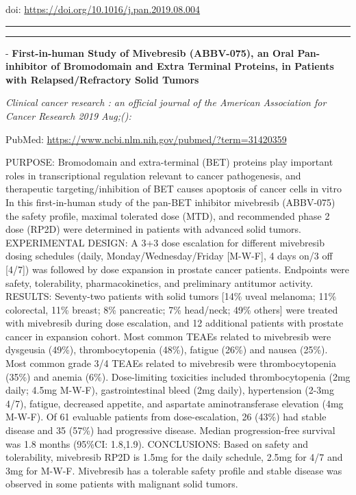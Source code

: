 \documentclass[]{article}
\begin{document}
doi: \url{https://doi.org/10.1016/j.pan.2019.08.004}

{}

{}

\begin{center}\rule{0.5\linewidth}{\linethickness}\end{center}

\begin{center}\rule{0.5\linewidth}{\linethickness}\end{center}

 - \textbf{First-in-human Study of Mivebresib (ABBV-075), an Oral
Pan-inhibitor of Bromodomain and Extra Terminal Proteins, in Patients
with Relapsed/Refractory Solid Tumors}

\emph{Clinical cancer research : an official journal of the American
Association for Cancer Research 2019 Aug;():}

PubMed: \url{https://www.ncbi.nlm.nih.gov/pubmed/?term=31420359}

PURPOSE: Bromodomain and extra-terminal (BET) proteins play important
roles in transcriptional regulation relevant to cancer pathogenesis, and
therapeutic targeting/inhibition of BET causes apoptosis of cancer cells
in vitro In this first-in-human study of the pan-BET inhibitor
mivebresib (ABBV-075) the safety profile, maximal tolerated dose (MTD),
and recommended phase 2 dose (RP2D) were determined in patients with
advanced solid tumors. EXPERIMENTAL DESIGN: A 3+3 dose escalation for
different mivebresib dosing schedules (daily, Monday/Wednesday/Friday
{[}M-W-F{]}, 4 days on/3 off {[}4/7{]}) was followed by dose expansion
in prostate cancer patients. Endpoints were safety, tolerability,
pharmacokinetics, and preliminary antitumor activity. RESULTS:
Seventy-two patients with solid tumors {[}14\% uveal melanoma; 11\%
colorectal, 11\% breast; 8\% pancreatic; 7\% head/neck; 49\% others{]}
were treated with mivebresib during dose escalation, and 12 additional
patients with prostate cancer in expansion cohort. Most common TEAEs
related to mivebresib were dysgeusia (49\%), thrombocytopenia (48\%),
fatigue (26\%) and nausea (25\%). Most common grade 3/4 TEAEs related to
mivebresib were thrombocytopenia (35\%) and anemia (6\%). Dose-limiting
toxicities included thrombocytopenia (2mg daily; 4.5mg M-W-F),
gastrointestinal bleed (2mg daily), hypertension (2-3mg 4/7), fatigue,
decreased appetite, and aspartate aminotransferase elevation (4mg
M-W-F). Of 61 evaluable patients from dose-escalation, 26 (43\%) had
stable disease and 35 (57\%) had progressive disease. Median
progression-free survival was 1.8 months (95\%CI: 1.8,1.9). CONCLUSIONS:
Based on safety and tolerability, mivebresib RP2D is 1.5mg for the daily
schedule, 2.5mg for 4/7 and 3mg for M-W-F. Mivebresib has a tolerable
safety profile and stable disease was observed in some patients with
malignant solid tumors.
\end{document}
